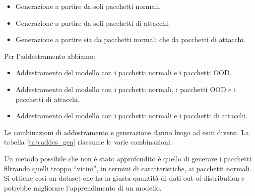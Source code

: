 \begin{itemize}
  \item Generazione a partire da soli pacchetti normali.
  \item Generazione a partire da soli pacchetti di attacchi.
  \item Generazione a partire sia da pacchetti normali che da pacchetti di attacchi.
\end{itemize}

Per l'addestramento abbiamo:

\begin{itemize}
  \item Addestramento del modello con i pacchetti normali e i pacchetti OOD.
  \item Addestramento del modello con i pacchetti normali, i pacchetti OOD e i pacchetti di attacchi.
  \item Addestramento del modello con i pacchetti normali e i pacchetti di attacchi.
\end{itemize}

Le combinazioni di addestramento e generazione danno luogo ad esiti diversi. La tabella \ref{tab:addes_gen} riassume le varie combinazioni.

\begin{table}\centering\setlength\tabcolsep{3.5pt}\renewcommand{}
  \noindent{}
\caption{\label{tab:addes_gen} Combinazioni di generazione dei pacchetti e addestramento del modello, dove N = pacchetti normali, AV = pacchetti di attacchi veri, CMP = pacchetti normali + pacchetti di attacchi, OOD = pacchetti generati. Si trova poi AV OOD, N OOD, N+AV OOD, rispettivamente dati generati a partire da attacchi, dati generati a partire da pacchetti normali, dati generati a partire dal dataset completo}
\end{table}


Un metodo possibile che non è stato approfondito è quello di generare i pacchetti filtrando quelli troppo ``vicini'', in termini di caratteristiche, ai pacchetti normali. Si ottiene così un dataset che ha la giusta quantità di dati out-of-distribution e potrebbe migliorare l'apprendimento di un modello.

